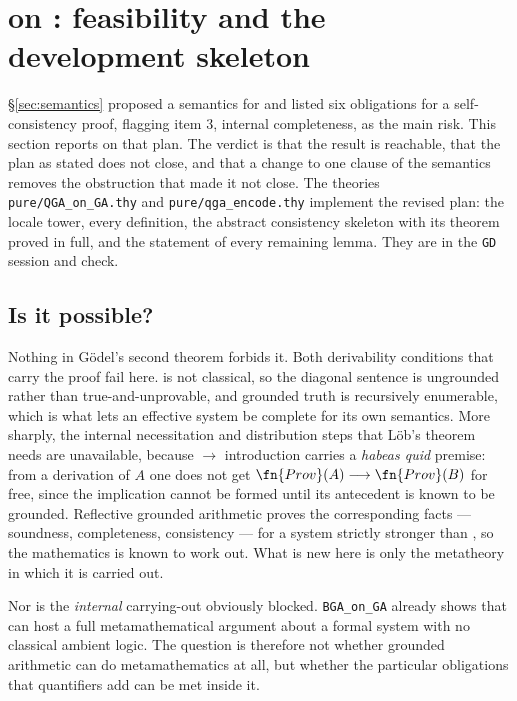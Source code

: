 \section{\QGA{} on \QGA: feasibility and the development skeleton}
\label{sec:self}

\providecommand{\tv}[1]{\ensuremath{\mathsf{#1}}}

\S\ref{sec:semantics} proposed a semantics for \QGA{} and listed six obligations
for a self-consistency proof, flagging item 3, internal completeness, as the
main risk.  This section reports on that plan.  The verdict is that the result
is reachable, that the plan as stated does not close, and that a change to one
clause of the semantics removes the obstruction that made it not close.  The
theories \texttt{pure/QGA\_on\_GA.thy} and \texttt{pure/qga\_encode.thy}
implement the revised plan: the locale tower, every definition, the abstract
consistency skeleton with its theorem proved in full, and the statement of
every remaining lemma.  They are in the \texttt{GD} session and check.

\subsection{Is it possible?}

Nothing in G\"odel's second theorem forbids it.  Both derivability conditions
that carry the proof fail here.  \QGA{} is not classical, so the diagonal
sentence is ungrounded rather than true-and-unprovable, and grounded truth is
recursively enumerable, which is what lets an effective system be complete for
its own semantics.  More sharply, the internal necessitation and distribution
steps that L\"ob's theorem needs are unavailable, because $\longrightarrow$
introduction carries a \emph{habeas quid} premise: from a derivation of $A$ one
does not get $\fn{Prov}(A) \longrightarrow \fn{Prov}(B)$ for free, since the
implication cannot be formed until its antecedent is known to be grounded.  Reflective
grounded arithmetic proves the corresponding facts --- soundness, completeness,
consistency --- for a system strictly stronger than \QGA, so the mathematics is
known to work out.  What is new here is only the metatheory in which it is
carried out.

Nor is the \emph{internal} carrying-out obviously blocked.  \texttt{BGA\_on\_GA}
already shows that \QGA{} can host a full metamathematical argument about a
formal system with no classical ambient logic.  The question is therefore not
whether grounded arithmetic can do metamathematics at all, but whether the
particular obligations that quantifiers add can be met inside it.

